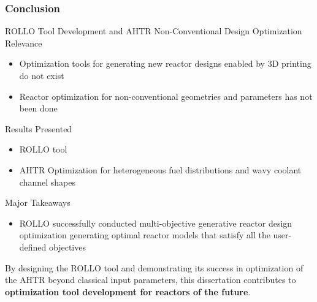 \begin{frame}
    \frametitle{Conclusion}
    \begin{block}{ROLLO Tool Development and AHTR Non-Conventional Design Optimization}
        \small
        Relevance
        \begin{itemize}
            \item Optimization tools for generating new reactor designs enabled by
            3D printing do not exist
            \item Reactor optimization for non-conventional geometries and parameters 
            has not been done 
        \end{itemize}
        Results Presented
        \begin{itemize}
            \item \acrfull{ROLLO} tool 
            \item AHTR Optimization for heterogeneous fuel distributions and wavy 
            coolant channel shapes 
        \end{itemize}
        Major Takeaways 
        \begin{itemize}
            \item ROLLO successfully conducted multi-objective generative reactor 
            design optimization generating optimal reactor models that satisfy all the 
            user-defined objectives
        \end{itemize}
    \end{block}
    \vspace{-0.1cm}
    By designing the \gls{ROLLO} tool and demonstrating its success in 
    optimization of the \gls{AHTR} beyond classical input parameters, this dissertation 
    contributes to \textbf{optimization tool development for reactors of the future}. 
\end{frame}

